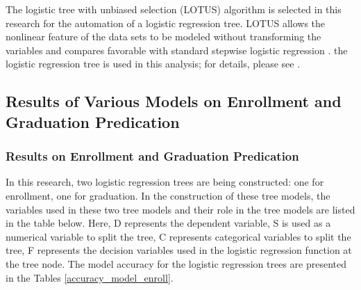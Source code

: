 \documentclass[12pt,english]{report}
\begin{document}
The logistic tree with unbiased selection (LOTUS) algorithm \citep{lotus2}  is
selected in this research for the automation of a logistic regression tree.
LOTUS allows the nonlinear feature of the data sets to be modeled without
transforming the variables and compares favorable with standard stepwise
logistic regression \citep{lotus_app1,lotus_app2}. %
the logistic regression tree is used in this analysis; for details, please see
\citep{lotus2}.


\subsection{Results of Various Models on Enrollment and Graduation Predication}
\subsubsection{Results on Enrollment and Graduation Predication}

In this research, two logistic regression trees are being constructed: one for
enrollment, one for graduation.  In the construction of these tree models, the
variables used in these two tree models and their role in the tree models are
listed in the table below. Here, D represents the dependent variable, S is used
as a numerical variable to split the tree, C represents categorical variables
to split the tree, F represents the decision variables used in the logistic
regression function at the tree node.  The model accuracy for the logistic
regression trees are presented in the Tables \ref{accuracy_model_enroll}.
\end{document}
